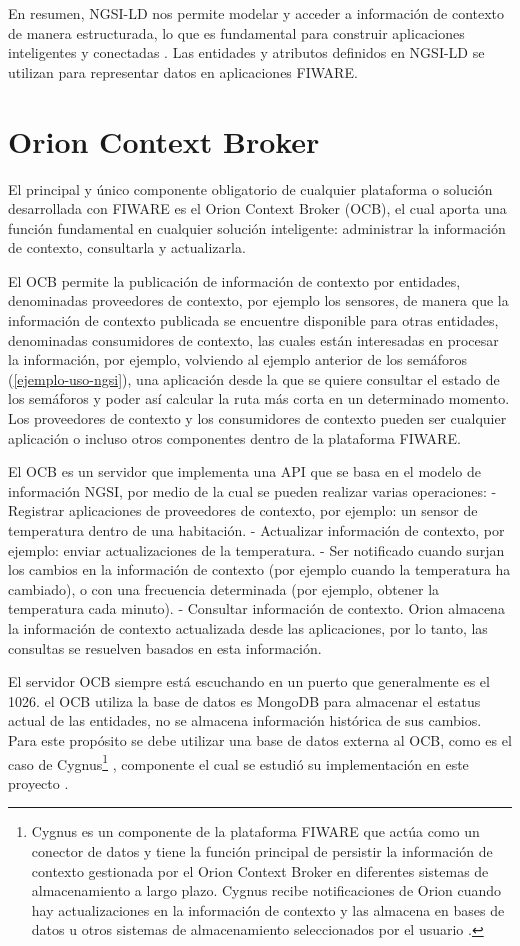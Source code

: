 En resumen, NGSI-LD nos permite modelar y acceder a información de contexto de manera estructurada, lo que es fundamental para construir aplicaciones inteligentes y conectadas \cite{fiware_ngsi_ld}. Las entidades y atributos definidos en NGSI-LD se utilizan para representar datos en aplicaciones FIWARE.


\section{Orion Context Broker}
El principal y único componente obligatorio de cualquier plataforma o solución desarrollada con FIWARE es el Orion Context Broker (OCB), el cual aporta una función fundamental en cualquier solución inteligente: administrar la información de contexto, consultarla y actualizarla.

El OCB permite la publicación de información de contexto por entidades, denominadas proveedores de contexto, por ejemplo los sensores, de manera que la información de contexto publicada se encuentre disponible para otras entidades, denominadas consumidores de contexto, las cuales están interesadas en procesar la información, por ejemplo, volviendo al ejemplo anterior de los semáforos (\ref{ejemplo-uso-ngsi}), una aplicación desde la que se quiere consultar el estado de los semáforos y poder así calcular la ruta más corta en un determinado momento. Los proveedores de contexto y los consumidores de contexto pueden ser cualquier aplicación o incluso otros componentes dentro de la plataforma FIWARE.

El OCB es un servidor que implementa una API que se basa en el modelo de información NGSI, por medio de la cual se pueden realizar varias operaciones: - Registrar aplicaciones de proveedores de contexto, por ejemplo: un sensor de temperatura dentro de una habitación. - Actualizar información de contexto, por ejemplo: enviar actualizaciones de la temperatura. - Ser notificado cuando surjan los cambios en la información de contexto (por ejemplo cuando la temperatura ha cambiado), o con una frecuencia determinada (por ejemplo, obtener la temperatura cada minuto). - Consultar información de contexto. Orion almacena la información de contexto actualizada desde las aplicaciones, por lo tanto, las consultas se resuelven basados en esta información.

El servidor OCB siempre está escuchando en un puerto que generalmente es el 1026. el OCB utiliza la base de datos es MongoDB para almacenar el estatus actual de las entidades, no se almacena información histórica de sus cambios. Para este propósito se debe utilizar una base de datos externa al OCB, como es el caso de Cygnus\footnote{Cygnus es un componente de la plataforma FIWARE que actúa como un conector de datos y tiene la función principal de persistir la información de contexto gestionada por el Orion Context Broker en diferentes sistemas de almacenamiento a largo plazo. Cygnus recibe notificaciones de Orion cuando hay actualizaciones en la información de contexto y las almacena en bases de datos u otros sistemas de almacenamiento seleccionados por el usuario \cite{fiware_cygnus}.} , componente el cual se estudió su implementación en este proyecto  \cite{orion}.

